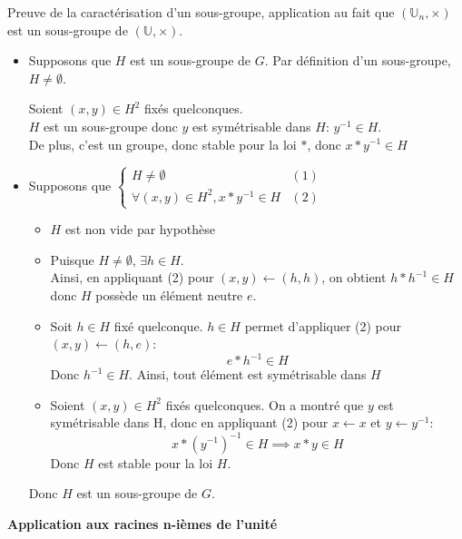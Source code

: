 \documentclass{article}
\renewenvironment{question_kholle}[2][ ]
{
	\subsection{\texorpdfstring{#2}{}}
	\notblank{#1}
	{
		\noindent #1
		\bigbreak
	}
	{}
	\begin{proof}
}
{
	\end{proof}
}
\begin{document}
\begin{question_kholle}{Preuve de la caractérisation d'un sous-groupe, application au fait que $(\mathbb U _n, \times)$ est un sous-groupe de $(\mathbb U, \times)$.}
	\;\\
	\begin{itemize}[label=$\star$]
		\item Supposons que $H$ est un sous-groupe de $G$.
		      Par définition d'un sous-groupe, $H \neq \emptyset$.

		      Soient $(x, y) \in H^{2}$ fixés quelconques.\\
		      $H$ est un sous-groupe donc $y$ est symétrisable dans $H$: $y^{-1} \in H$.\\
		      De plus, c'est un groupe, donc stable pour la loi $*$, donc $x*y^{-1} \in H$

		\item Supposons que $\left\{ \begin{array}{ll}H \neq \emptyset &(1) \\\forall (x, y) \in H^{2}, x * y^{-1} \in H & (2)\end{array}\right.$
		      \begin{itemize}[label=$\lozenge$]
			      \item $H$ est non vide par hypothèse
			      \item Puisque $H \neq \emptyset$, $\exists h \in H$.\\
			            Ainsi, en appliquant (2) pour $(x,y)\leftarrow (h,h)$, on obtient $h * h^{-1} \in H$ donc $H$ possède un élément neutre $e$.
			      \item Soit $h \in H$ fixé quelconque.
			            $h \in H$ permet d'appliquer (2) pour $(x,y) \leftarrow (h,e)$:
			            $$
				            e * h^{-1} \in H
			            $$
			            Donc $h^{-1} \in H$. Ainsi, tout élément est symétrisable dans $H$
			      \item Soient $(x, y) \in H^{2}$ fixés quelconques. On a montré que $y$ est symétrisable dans H, donc en appliquant (2) pour $x \leftarrow x$ et $y \leftarrow y^{-1}$:
			            $$
				            x * (y^{-1})^{-1} \in H \implies x* y \in H
			            $$
			            Donc $H$ est stable pour la loi $H$.
		      \end{itemize}
		      Donc $H$ est un sous-groupe de $G$.
	\end{itemize}
\end{question_kholle}
\textbf{Application aux racines n-ièmes de l'unité}
\end{document}
